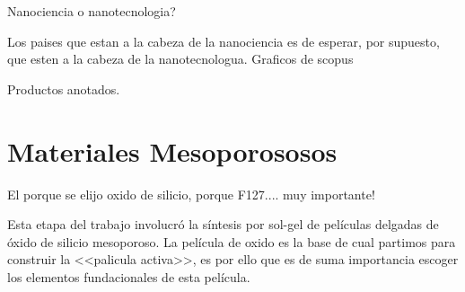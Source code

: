 	Nanociencia o nanotecnologia?

	Los paises que estan a la cabeza de la nanociencia es de esperar, por supuesto, que esten a la cabeza de la nanotecnologua. 
	Graficos de scopus

	Productos anotados.






 







\section{Materiales Mesoporososos}\label{sec:mesoporosos}

				El porque se elijo oxido de silicio, porque F127.... muy importante!
				
				Esta etapa del trabajo involucró la síntesis por sol-gel de películas delgadas de óxido de silicio mesoporoso. La película de oxido es la base de cual partimos para construir la <<palicula activa>>, es por ello que es de suma importancia escoger los elementos fundacionales de esta película. \cite{Soler-Illia2002a,Brinker1999,Soler-Illia2006,Grosso2004,Innocenzi2013}

